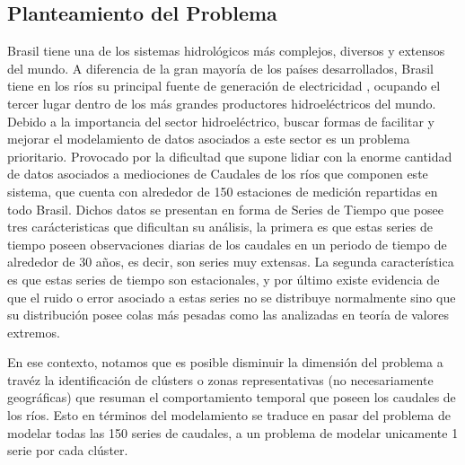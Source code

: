 \documentclass[10pt,a4paper]{article}
\begin{document}
\subsection{Planteamiento del Problema}
Brasil tiene una de los sistemas hidrológicos más complejos, diversos y extensos del mundo. A diferencia de la gran mayoría de los países desarrollados, Brasil tiene en los ríos su principal fuente de generación de electricidad , ocupando el tercer lugar dentro de los más grandes productores hidroeléctricos del mundo. Debido a la importancia del sector hidroeléctrico, buscar formas de facilitar y mejorar el modelamiento de datos asociados a este sector es un problema prioritario. Provocado por la dificultad que supone lidiar con la enorme cantidad de datos asociados a mediociones de Caudales de los ríos que componen este sistema, que cuenta con alrededor de 150 estaciones de medición repartidas en todo Brasil. Dichos datos se presentan en forma de Series de Tiempo que posee tres carácteristicas que dificultan su análisis, la primera es que estas series de tiempo poseen observaciones diarias de los caudales en un periodo de tiempo de alrededor de 30 años, es decir, son series muy extensas. La segunda característica es que estas series de tiempo son estacionales, y por último existe evidencia de que el ruido o error asociado a estas series no se distribuye normalmente sino que su distribución posee colas más pesadas como las analizadas en teoría de valores extremos.

En ese contexto, notamos que es posible disminuir la dimensión del problema a travéz la identificación de clústers o zonas representativas (no necesariamente geográficas) que resuman el comportamiento temporal que poseen los caudales de los ríos. Esto en términos del modelamiento se traduce en pasar del problema de modelar todas las 150 series de caudales, a un problema de modelar unicamente 1 serie por cada clúster. 



\end{document}
